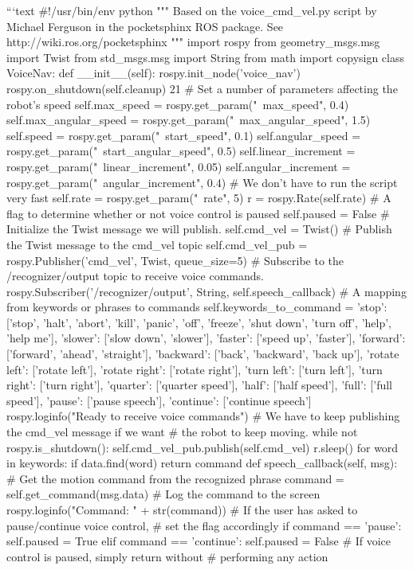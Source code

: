 ```text
#!/usr/bin/env python
"""
Based on the voice_cmd_vel.py script by Michael Ferguson in the pocketsphinx ROS package.
See http://wiki.ros.org/pocketsphinx
""" 
import rospy
from geometry_msgs.msg import Twist
from std_msgs.msg import String
from math import copysign
class VoiceNav:
def __init__(self):
rospy.init_node('voice_nav')
rospy.on_shutdown(self.cleanup) 21
# Set a number of parameters affecting the robot's speed
self.max_speed = rospy.get_param("~max_speed", 0.4)
self.max_angular_speed = rospy.get_param("~max_angular_speed", 1.5)
self.speed = rospy.get_param("~start_speed", 0.1)
self.angular_speed = rospy.get_param("~start_angular_speed", 0.5)
self.linear_increment = rospy.get_param("~linear_increment", 0.05)
self.angular_increment = rospy.get_param("~angular_increment", 0.4)
# We don't have to run the script very fast
self.rate = rospy.get_param("~rate", 5)
r = rospy.Rate(self.rate)
# A flag to determine whether or not voice control is paused
self.paused = False
# Initialize the Twist message we will publish.
self.cmd_vel = Twist()
# Publish the Twist message to the cmd_vel topic
self.cmd_vel_pub = rospy.Publisher('cmd_vel', Twist, queue_size=5)
# Subscribe to the /recognizer/output topic to receive voice commands.
rospy.Subscriber('/recognizer/output', String, self.speech_callback)
# A mapping from keywords or phrases to commands
self.keywords_to_command = {'stop': ['stop', 'halt', 'abort', 'kill',
'panic', 'off', 'freeze', 'shut down', 'turn off', 'help', 'help me'],
'slower': ['slow down', 'slower'],
'faster': ['speed up', 'faster'],
'forward': ['forward', 'ahead',
'straight'],
'backward': ['back', 'backward', 'back up'],
'rotate left': ['rotate left'],
'rotate right': ['rotate right'],
'turn left': ['turn left'],
'turn right': ['turn right'],
'quarter': ['quarter speed'],
'half': ['half speed'],
'full': ['full speed'],
'pause': ['pause speech'],
'continue': ['continue speech']}
rospy.loginfo("Ready to receive voice commands")
# We have to keep publishing the cmd_vel message if we want # the robot to keep moving.
while not rospy.is_shutdown(): self.cmd_vel_pub.publish(self.cmd_vel) r.sleep()
for word in keywords: if data.find(word) return command
def speech_callback(self, msg):
# Get the motion command from the recognized phrase command = self.get_command(msg.data)
# Log the command to the screen
rospy.loginfo("Command: " + str(command))
# If the user has asked to pause/continue voice control, # set the flag accordingly
if command == 'pause':
self.paused = True elif command == 'continue':
self.paused = False
# If voice control is paused, simply return without # performing any action
